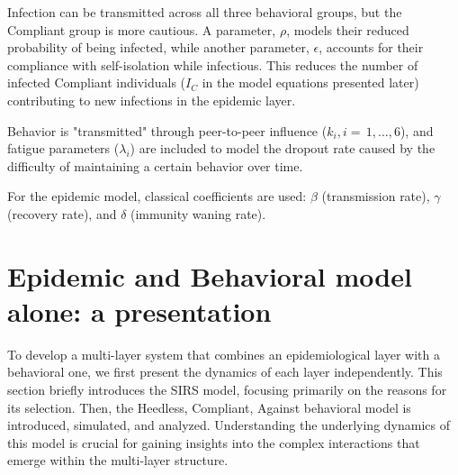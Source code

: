 Infection can be transmitted across all three behavioral groups, but the Compliant group is more cautious. A parameter, $\rho$, models their reduced probability of being infected, while another parameter, $\epsilon$, accounts for their compliance with self-isolation while infectious. This reduces the number of infected Compliant individuals ($I_C$ in the model equations presented later) contributing to new infections in the epidemic layer.

Behavior is "transmitted" through peer-to-peer influence ($k_i, i = \,1,...,6$), and fatigue parameters ($\lambda_i$) are included to model the dropout rate caused by the difficulty of maintaining a certain behavior over time.

For the epidemic model, classical coefficients are used: $\beta$ (transmission rate), $\gamma$ (recovery rate), and $\delta$ (immunity waning rate).
 

\chapter{Epidemic and Behavioral model alone: a presentation}
\label{ch:model_alone}

To develop a multi-layer system that combines an epidemiological layer with a behavioral one, we first present the dynamics of each layer independently. This section briefly introduces the SIRS model, focusing primarily on the reasons for its selection. Then, the Heedless, Compliant, Against behavioral model is introduced, simulated, and analyzed. Understanding the underlying dynamics of this model is crucial for gaining insights into the complex interactions that emerge within the multi-layer structure.


